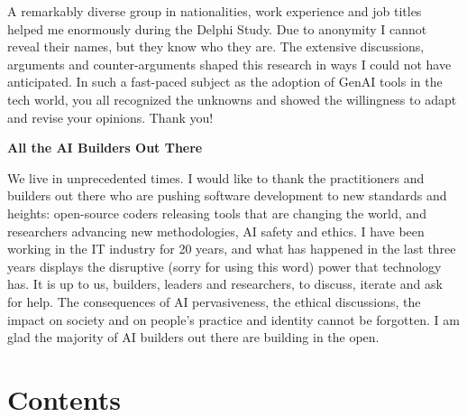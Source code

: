 \noindent A remarkably diverse group in nationalities, work experience and job titles
helped me enormously during the Delphi Study. Due to anonymity I cannot reveal
their names, but they know who they are. The extensive discussions, arguments
and counter-arguments shaped this research in ways I could not have anticipated.
In such a fast-paced subject as the adoption of GenAI tools in the tech world,
you all recognized the unknowns and showed the willingness to adapt and revise
your opinions. Thank you!

\vspace{1em}
\noindent\textbf{All the AI Builders Out There}
\vspace{0.5em}

\noindent We live in unprecedented times. I would like to thank the practitioners and
builders out there who are pushing software development to new standards and
heights: open-source coders releasing tools that are changing the world, and
researchers advancing new methodologies, AI safety and ethics. I have been
working in the IT industry for 20 years, and what has happened in the last
three years displays the disruptive (sorry for using this word) power that
technology has. It is up to us, builders, leaders and researchers, to discuss,
iterate and ask for help. The consequences of AI pervasiveness, the ethical
discussions, the impact on society and on people's practice and identity cannot
be forgotten. I am glad the majority of AI builders out there are building in
the open.

\newpage\thispagestyle{empty}\mbox{}\newpage

{}
\section*{Contents}
\etocstandardlines          %
\tableofcontents
  {\begin{list}{}{\setlength{\leftmargin}{0.5in}\setlength{\itemsep}{0pt}\setlength{\parsep}{0pt}}}
  {\item}
  {\makebox[2.5em][l]{\etocnumber}\etocname\nobreak\leaders\hbox to 0.5em{\hss.\hss}\hfill\nobreak\makebox[2em][r]{\etocpage}}
  {\end{list}}
\clearpage

